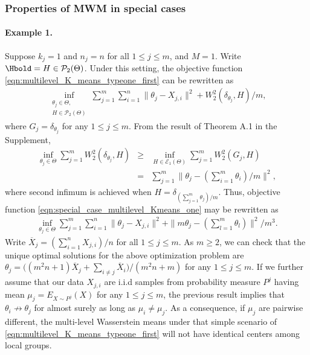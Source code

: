 \subsubsection{Properties of MWM in special cases} \label{Section:mwm_specical_cases}
\paragraph{Example 1.} Suppose $k_{j}=1$ and $n_{j}=n$ for all $1 \leq j \leq m$, and $M=1$. Write
$\Hbold = H \in \mathcal{P}_2(\Theta)$. Under 
this setting, the objective function \eqref{eqn:multilevel_K_means_typeone_first} can be 
rewritten as
\begin{eqnarray}
\mathop {\inf }\limits_{\substack {\theta_{j} \in \Theta, \\ H \in \mathcal{P}_{2}(\Theta)}}{\sum \limits_{j=1}^{m}{\sum \limits_{i=1}^{n}{\|\theta_{j}-X_{j,i}\|^{2}}}}
+W_{2}^{2}(\delta_{\theta_{j}},H)/m, \label{eqn:special_case_multilevel_Kmeans_one} 
\end{eqnarray}
where $G_{j}=\delta_{\theta_{j}}$ for any $1 \leq j \leq m$. From the result of Theorem 
A.1 in the Supplement, %
\vspace{-6pt}
\begin{eqnarray}
\mathop {\inf } \limits_{\theta_{j} \in \Theta}{\sum \limits_{j=1}^{m}{W_{2}^{2}(\delta_{\theta_{j}},H)}} & \geq & \mathop {\inf }\limits_{H \in \mathcal{E}_{1}(\Theta)}{\sum \limits_{j=1}^{m}{W_{2}^{2}(G_{j},H)}} \nonumber \\
& = & \sum \limits_{j=1}^{m}{\|\theta_{j}-(\sum \limits_{i=1}^{m}{\theta_{i}})/m\|^{2}}, \nonumber
\end{eqnarray}
where second infimum is achieved when $H=\delta_{(\sum \limits_{j=1}^{m}{\theta_{j}})/m}$. 
Thus, objective function \eqref{eqn:special_case_multilevel_Kmeans_one} may
be rewritten as
\vspace{-6pt}
\begin{eqnarray}
\mathop {\inf }\limits_{\theta_{j} \in \Theta}{\sum \limits_{j=1}^{m}{\sum \limits_{i=1}^{n}{\|\theta_{j}-X_{j,i}\|^{2}}}} +\| m\theta_{j}-(\sum \limits_{l=1}^{m}{\theta_{l}})\|^{2}/m^{3}. \nonumber
\end{eqnarray}
Write $\overline{X}_{j}=(\sum \limits_{i=1}^{n}{X_{j,i}})/n$ for all $1 \leq j \leq m$. 
As $m \geq 2$, we can check that the unique optimal solutions for the above optimization 
problem are $\theta_{j}=\biggr((m^2n+1)\overline{X}_{j}+\sum \limits_{i \neq j}
{\overline{X}_{i}}\biggr)/(m^{2}n+m)$ for any $1 \leq j \leq m$. If we further assume that 
our data $X_{j,i}$ are i.i.d samples from probability measure $P^{j}$ having mean $\mu_{j}
=E_{X \sim P^{j}}(X)$ for any $1 \leq j \leq m$, the previous result implies that $\theta_{i} 
\not \to \theta_{j}$ for almost surely as long as $\mu_{i} \neq \mu_{j}$. As a 
consequence, if $\mu_{j}$ are pairwise different, the multi-level Wasserstein means under 
that simple scenario of \eqref{eqn:multilevel_K_means_typeone_first} will not have identical 
centers among local groups. 


